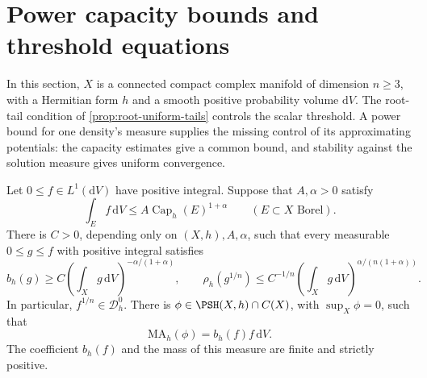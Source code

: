 \section{Power capacity bounds and threshold equations}
\label{sec:power-capacity-threshold}

In this section, $X$ is a connected compact complex manifold of dimension $n\geq3$, with a Hermitian form $h$ and a smooth positive probability volume $\mathrm dV$. The root-tail condition of \cref{prop:root-uniform-tails} controls the scalar threshold. A power bound for one density's measure supplies the missing control of its approximating potentials: the capacity estimates give a common bound, and stability against the solution measure gives uniform convergence.

\begin{theorem}\label{thm:power-capacity-critical-equation}
Let $0\leq f\in L^1(\mathrm dV)$ have positive integral. Suppose that $A,\alpha>0$ satisfy
\begin{equation}\label{eq:datum-power-capacity}
 \int_Ef\,\mathrm dV\leq A\operatorname{Cap}_h(E)^{1+\alpha}
 \qquad(E\subset X\text{ Borel}).
\end{equation}
There is $C>0$, depending only on $(X,h),A,\alpha$, such that every measurable $0\leq g\leq f$ with positive integral satisfies
\begin{equation}\label{eq:power-capacity-critical-bound}
 b_h(g)\geq C\left(\int_Xg\,\mathrm dV\right)^{-\alpha/(1+\alpha)},
 \qquad
 \rho_h(g^{1/n})\leq C^{-1/n}
        \left(\int_Xg\,\mathrm dV\right)^{\alpha/(n(1+\alpha))}.
\end{equation}
In particular, $f^{1/n}\in\mathcal D_h^0$. There is $\phi\in\PSH(X,h)\cap C(X)$, with $\sup_X\phi=0$, such that
\begin{equation}\label{eq:power-capacity-exact-threshold}
 \mathrm{MA}_h(\phi)=b_h(f)f\,\mathrm dV.
\end{equation}
The coefficient $b_h(f)$ and the mass of this measure are finite and strictly positive.
\end{theorem}
